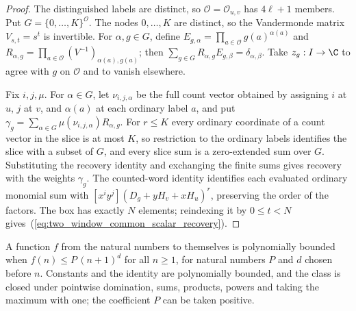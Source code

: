 \begin{proof}\leanok
    The distinguished labels are distinct, so $\mathcal O=\mathcal O_{u,v}$
    has $4\ell+1$ members. Put $G=\{0,\ldots,K\}^{\mathcal O}$.
    The nodes $0,\ldots,K$ are distinct, so the Vandermonde matrix
    $V_{s,t}=s^t$ is invertible. For $\alpha,g\in G$, define
    $E_{g,\alpha}=\prod_{a\in\mathcal O}g(a)^{\alpha(a)}$ and
    $R_{\alpha,g}=\prod_{a\in\mathcal O}(V^{-1})_{\alpha(a),g(a)}$; then
    $\sum_{g\in G}R_{\alpha,g}E_{g,\beta}=\delta_{\alpha,\beta}$.
    Take $z_g:I\to\C$ to agree with $g$ on $\mathcal O$ and to vanish
    elsewhere.

    Fix $i,j,\mu$. For $\alpha\in G$, let $\nu_{i,j,\alpha}$ be the
    full count vector obtained by assigning $i$ at $u$, $j$ at $v$, and
    $\alpha(a)$ at each ordinary label $a$, and put
    $\gamma_g=\sum_{\alpha\in G}\mu(\nu_{i,j,\alpha})R_{\alpha,g}$.
    For $r\le K$ every ordinary coordinate of a count vector in the slice is
    at most $K$, so restriction to the ordinary labels identifies the slice
    with a subset of $G$, and every slice sum is a zero-extended sum over $G$.
    Substituting the recovery identity and exchanging the finite sums gives
    recovery with the weights $\gamma_g$. The counted-word identity identifies
    each evaluated ordinary monomial sum with $[x^iy^j](D_g+yH_v+xH_u)^r$,
    preserving the order of the factors. The box has exactly $N$ elements;
    reindexing it by $0\le t<N$ gives~(\ref{eq:two_window_common_scalar_recovery}).
\end{proof}

\begin{definition}
    \label{def:nat_polynomial_bounded}
    \leanok
    A function $f$ from the natural numbers to themselves is polynomially
    bounded when $f(n)\le P\,(n+1)^d$ for all $n\ge1$, for natural numbers $P$
    and $d$ chosen before $n$. Constants and the identity are polynomially
    bounded, and the class is closed under pointwise domination, sums,
    products, powers and taking the maximum with one; the coefficient $P$ can be
    taken positive.
\end{definition}


